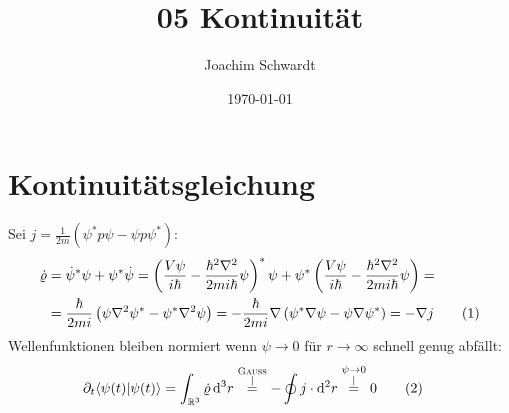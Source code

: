 \documentclass[a4paper,12pt]{article}
\newcommand\numberthis{\addtocounter{equation}{1}\tag{\theequation}}
\newcommand{\kom}{}
\newcommand{\brak}{}
\newcommand{\intr}{}
\newcommand{\kla}{}
\begin{document}
\title{05 Kontinuität}
\author{Joachim Schwardt}
\date{\today}
\maketitle

\section{Kontinuitätsgleichung}
Sei $j=\frac{1}{2m}\kla\left( {\psi^\ast p\psi - \psi p\psi^\ast} \right)$:
\begin{align*}
\dot{\varrho}&=\dot{\psi}^\ast\psi + \psi^\ast\dot{\psi}=\kla\left( {\frac{V\psi}{i\hbar}-\frac{\hbar^2\nabla^2}{2mi\hbar}\psi} \right)^\ast\psi + \psi^\ast\kla\left( {\frac{V\psi}{i\hbar}-\frac{\hbar^2\nabla^2}{2mi\hbar}\psi} \right)= \\
&= \frac{\hbar}{2mi}\kla\left( {\psi\nabla^2\psi^\ast - \psi^\ast\nabla^2\psi } \right)= -\frac{\hbar}{2mi}\nabla\kla\left( {\psi^\ast\nabla\psi - \psi\nabla\psi^\ast} \right)=-\nabla j\numberthis\label{rho punkt + nabla j = 0}
\end{align*}
Wellenfunktionen bleiben normiert wenn $\psi\rightarrow 0$ für $r\rightarrow\infty$ schnell genug abfällt:
\begin{align*}
\partial_t\brak\langle {\psi(t)}| {\psi(t)}\rangle&=\intr\int_{\mathbb{R}^{3}}{\dot{\varrho}}\,\mathrm{d}^{3}r\kom\overset{\substack{{\textsc{Gauss}} \\ |}}{=}-\oint j\cdot\mathrm{d}^2r\kom\overset{\substack{{\psi\rightarrow 0} \\ |}}{=}0 \numberthis\label{dt Normierung}
\end{align*}
\end{document}
